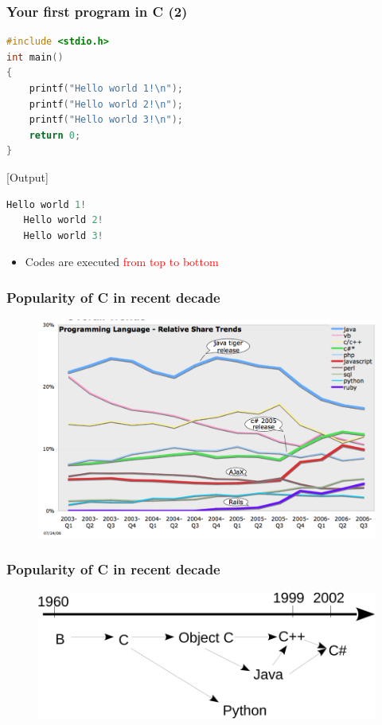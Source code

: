 \begin{frame}[fragile]
	\frametitle{Your first program in C (2)}
\begin{lstlisting}[language=c]
#include <stdio.h>
int main()
{  
    printf("Hello world 1!\n"); 
    printf("Hello world 2!\n"); 
    printf("Hello world 3!\n"); 
    return 0;                 
} 
\end{lstlisting}
[Output]
\begin{lstlisting}[language=c]
   Hello world 1!
   Hello world 2!
   Hello world 3!           
\end{lstlisting}
\vspace{-0.15in}
\begin{itemize}
		\item {Codes are executed \textcolor{red}{from top to bottom}}
\end{itemize}

\end{frame}

\begin{frame}
	\frametitle{Popularity of C in recent decade}
	\vspace{-0.1in}
	\begin{figure}
		\includegraphics[width=0.85\linewidth]{figs/lang_distr.pdf}
	\end{figure}
\end{frame}


\begin{frame}
	\frametitle{Popularity of C in recent decade}
	\vspace{-0.1in}
	\begin{figure}
		\includegraphics[width=0.85\linewidth]{figs/lag_evov.pdf}
	\end{figure}
\end{frame}


